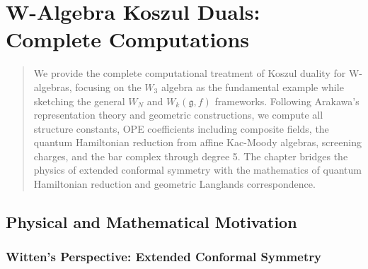 
\chapter{W-Algebra Koszul Duals: Complete Computations}\label{chap:w-algebra-koszul}

\begin{abstract}
We provide the complete computational treatment of Koszul duality for W-algebras, focusing on the $W_3$ algebra as the fundamental example while sketching the general $W_N$ and $W_k(\mathfrak{g}, f)$ frameworks. Following Arakawa's representation theory and geometric constructions, we compute all structure constants, OPE coefficients including composite fields, the quantum Hamiltonian reduction from affine Kac-Moody algebras, screening charges, and the bar complex through degree 5. The chapter bridges the physics of extended conformal symmetry with the mathematics of quantum Hamiltonian reduction and geometric Langlands correspondence.
\end{abstract}

\section{Physical and Mathematical Motivation}

\subsection{Witten's Perspective: Extended Conformal Symmetry}

